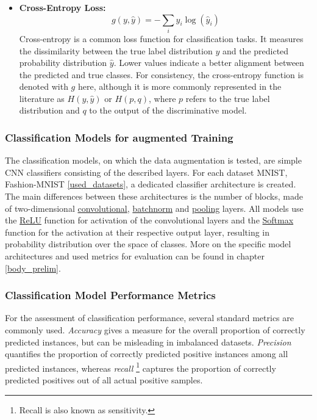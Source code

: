 \begin{itemize}
    \item \textbf{Cross-Entropy Loss:} \label{theoretical_loss_crossentropy}
    \begin{equation}
        g(y, \hat{y}) = -\sum_{i} y_i \log(\hat{y}_i)
    \end{equation}
    Cross-entropy is a common loss function for classification tasks. It measures the dissimilarity between the true label distribution \( y \) and the predicted probability distribution \( \hat{y} \). Lower values indicate a better alignment between the predicted and true classes. For consistency, the cross-entropy function is denoted with \( g \) here, although it is more commonly represented in the literature as \( H(y, \hat{y}) \) or \( H(p, q) \), where \( p \) refers to the true label distribution and \( q \) to the output of the discriminative model.


\end{itemize}

\subsubsection{Classification Models for augmented Training}
The classification models, on which the data augmentation is tested, are simple CNN classifiers consisting of the described layers. For each dataset MNIST, Fashion-MNIST \ref{used_datasets}, a dedicated classifier architecture is created. The main differences between these architectures is the number of blocks, made of two-dimensional \hyperref[theoretical_classification_conv_layers]{convolutional}, \hyperref[theoretical_classification_batchnorm_layers]{batchnorm} and \hyperref[theoretical_classification_pooling_layers]{pooling} layers. All models use the \hyperref[theoretical_activations_relu]{ReLU} function for activation of the convolutional layers and the \hyperref[theoretical_activations_softmax]{Softmax} function for the activation at their respective output layer, resulting in probability distribution over the space of classes. More on the specific model architectures and used metrics for evaluation can be found in chapter \ref{body_prelim}.

\subsubsection{Classification Model Performance Metrics} \label{theory_classification_performanc_metrics}
For the assessment of classification performance, several standard metrics are commonly used. \textit{Accuracy} gives a measure for the overall proportion of correctly predicted instances, but can be misleading in imbalanced datasets. \textit{Precision} quantifies the proportion of correctly predicted positive instances among all predicted instances, whereas \textit{recall} \footnote{Recall is also known as sensitivity.} captures the proportion of correctly predicted positives out of all actual positive samples. 

